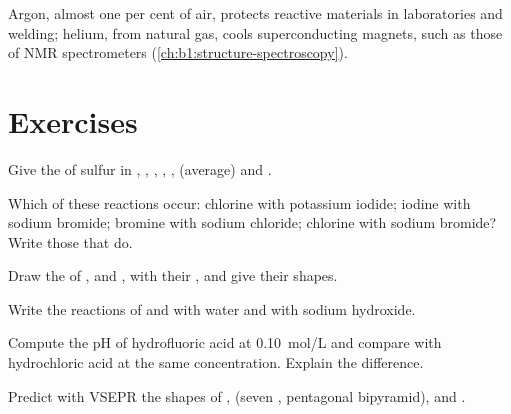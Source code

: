 Argon, almost one per cent of air, protects reactive materials in laboratories and
welding; helium, from natural gas, cools superconducting magnets, such as
those of NMR spectrometers (\cref{ch:b1:structure-spectroscopy}).

\section{Exercises}

\begin{exercise}[$\star$]\label{exo:b1:p-block-16-18:1}
Give the  of sulfur in , , ,
, ,  (average) and .
\end{exercise}

\begin{exercise}[$\star$]\label{exo:b1:p-block-16-18:2}
Which of these reactions occur: chlorine with potassium iodide; iodine with
sodium bromide; bromine with sodium chloride; chlorine with sodium bromide?
Write those that do.
\end{exercise}

\begin{exercise}[$\star$]\label{exo:b1:p-block-16-18:3}
Draw the  of ,  and , with their
, and give their shapes.
\end{exercise}

\begin{exercise}[$\star$]\label{exo:b1:p-block-16-18:4}
Write the reactions of  and  with water and with sodium
hydroxide.
\end{exercise}

\begin{exercise}[$\star\star$]\label{exo:b1:p-block-16-18:5}
Compute the pH of hydrofluoric acid at \qty{0.10}{mol/L} and compare with
hydrochloric acid at the same concentration. Explain the difference.
\end{exercise}

\begin{exercise}[$\star\star$]\label{exo:b1:p-block-16-18:6}
Predict with VSEPR the shapes of ,  (seven ,
pentagonal bipyramid),  and .
\end{exercise}

